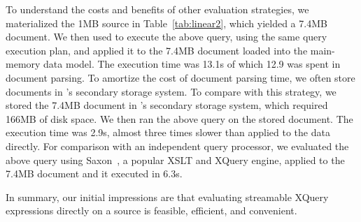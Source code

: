 To understand the costs and benefits of other evaluation strategies,
we materialized the 1MB \pads{} source in Table~\ref{tab:linear2},
which yielded a 7.4MB \Xml{} document.  We then used \Galax{} to
execute the above query, using the same query execution plan, and
applied it to the 7.4MB \Xml{} document loaded into the main-memory
data model.  The execution time was 13.1s of which 12.9 was spent in
document parsing.  To amortize the cost of document parsing time, we
often store documents in \Galax{}'s secondary storage system.  To
compare with this strategy, we stored the 7.4MB \Xml{} document in
\Galax{}'s secondary storage system, which required 166MB of disk
space.  We then ran the above query on the stored document.  The
execution time was 2.9s, almost three times slower than \padx{}
applied to the \pads{} data directly.  For comparison with an
independent query processor, we evaluated the above query using
Saxon~\cite{saxon}, a popular XSLT and XQuery engine, applied to the
7.4MB document and it executed in 6.3s.

In summary, our initial impressions are that evaluating
streamable XQuery expressions directly on a \pads{} source is 
feasible, efficient, and convenient. 


